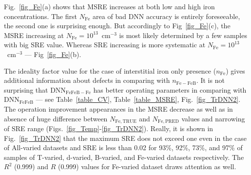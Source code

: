 \documentclass[num-refs]{wiley-article} %
\begin{document}
Fig.~\ref{fig_Fe}(a) shows that MSRE increases at both low and high iron concentrations.
The first $N_\mathrm{Fe}$ area of bad DNN accuracy is entirely  foreseeable,
the second one is surprising enough.
But accordingly to Fig~\ref{fig_Fe}(c), the MSRE increasing at $N_\mathrm{Fe}=10^{13}$~cm$^{-3}$ is most likely determined by  a few samples with big SRE value.
Whereas SRE increasing is more systematic at $N_\mathrm{Fe}=10^{13}$~cm$^{-3}$ --- Fig~\ref{fig_Fe}(b).

The ideality factor value for the case of interstitial iron only presence ($n_\mathrm{Fe}$)
gives additional information about defects in comparing with $n_\mathrm{Fe-FeB}$.
It is not surprising that DNN$_\mathrm{FeFeB-Fe}$ has better operating parameters in comparing with
DNN$_\mathrm{FeFeB}$ --- see Table~\ref{table_CV}, Table~\ref{table_MSRE}, Fig.~\ref{fig_TrDNN2}.
The operation improvement appearances in the MSRE decrease as well as in
absence of huge difference between $N_\mathrm{Fe,TRUE}$ and $N_\mathrm{Fe,PRED}$ values
and narrowing of SRE range (Figs.~\ref{fig_Temp}-\ref{fig_TrDNN2}).
Really, it is shown in Fig.~\ref{fig_TrDNN2} that the maximum SRE does not exceed one even in the case of All-varied datasets
and SRE is less than 0.02 for 93\%, 92\%, 73\%, and 97\% of samples of T-varied, d-varied, B-varied, and Fe-varied datasets respectively.
The $R^2$ (0.999) and $R$ (0.999) values for Fe-varied dataset draws attention as well.
\end{document}
